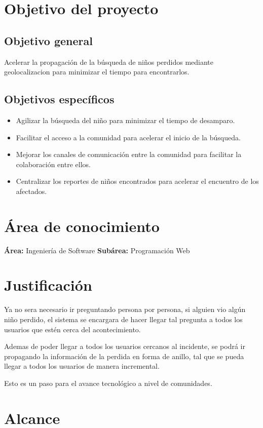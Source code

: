 \documentclass[letter,11pt,oneside,spanish]{article}
\begin{document}
\section{Objetivo del proyecto}
\subsection{Objetivo general}
Acelerar la propagación de la búsqueda de niños perdidos mediante geolocalizacion 
para minimizar el tiempo para encontrarlos.

\subsection{Objetivos específicos}
\begin{itemize}
\item Agilizar la búsqueda del niño para minimizar el tiempo de desamparo.
\item Facilitar el acceso a la comunidad para acelerar el inicio de la búsqueda.
\item Mejorar los canales de comunicación entre la comunidad para facilitar la colaboración entre ellos.
\item Centralizar los reportes de niños encontrados para acelerar el encuentro de los afectados.
\end{itemize}

\section{Área de conocimiento}
\textbf{Área:} Ingeniería de Software
\textbf{Subárea:} Programación Web

\newpage

\section{Justificación}
Ya no sera necesario ir preguntando persona por persona, si alguien vio
algún niño perdido, el sistema se encargara de hacer llegar tal pregunta a 
todos los  usuarios que estén cerca del acontecimiento.

Ademas de poder llegar a todos los usuarios cercanos al incidente, se podrá 
ir propagando la información de la perdida en forma de anillo, tal que se pueda
llegar a todos los usuarios de manera incremental.

Esto es un paso para el avance tecnológico a nivel de comunidades.

\section{Alcance}
\end{document}
